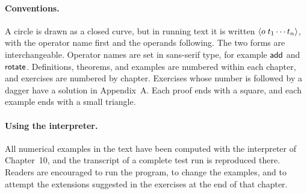 \paragraph{Conventions.}
A circle is drawn as a closed curve, but in running text it is written $\langle o\; t_1 \cdots t_n\rangle$, with the operator name first and the operands following. The two forms are interchangeable. Operator names are set in sans-serif type, for example $\mathsf{add}$ and $\mathsf{rotate}$. Definitions, theorems, and examples are numbered within each chapter, and exercises are numbered by chapter. Exercises whose number is followed by a dagger have a solution in Appendix~A. Each proof ends with a square, and each example ends with a small triangle.

\paragraph{Using the interpreter.}
All numerical examples in the text have been computed with the interpreter of Chapter~10, and the transcript of a complete test run is reproduced there. Readers are encouraged to run the program, to change the examples, and to attempt the extensions suggested in the exercises at the end of that chapter.
